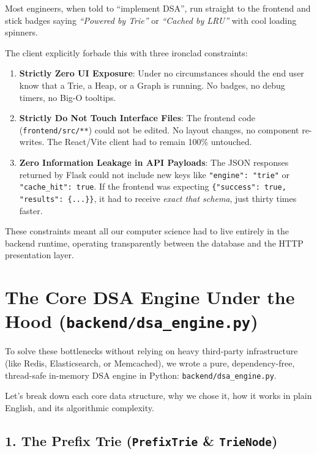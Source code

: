 \documentclass[11pt,a4paper]{article}
\begin{document}
Most engineers, when told to ``implement DSA'', run straight to the frontend and stick badges saying \textit{``Powered by Trie''} or \textit{``Cached by LRU''} with cool loading spinners. 

The client explicitly forbade this with three ironclad constraints:
\begin{enumerate}[leftmargin=1.5cm]
    \item \textbf{Strictly Zero UI Exposure}: Under no circumstances should the end user know that a Trie, a Heap, or a Graph is running. No badges, no debug timers, no Big-O tooltips.
    \item \textbf{Strictly Do Not Touch Interface Files}: The frontend code (\texttt{frontend/src/**}) could not be edited. No layout changes, no component re-writes. The React/Vite client had to remain 100\% untouched.
    \item \textbf{Zero Information Leakage in API Payloads}: The JSON responses returned by Flask could not include new keys like \texttt{"engine": "trie"} or \texttt{"cache\_hit": true}. If the frontend was expecting \texttt{\{"success": true, "results": \{...\}\}}, it had to receive \textit{exact that schema}, just thirty times faster.
\end{enumerate}

These constraints meant all our computer science had to live entirely in the backend runtime, operating transparently between the database and the HTTP presentation layer.

\section{The Core DSA Engine Under the Hood (\texttt{backend/dsa\_engine.py})}

To solve these bottlenecks without relying on heavy third-party infrastructure (like Redis, Elasticsearch, or Memcached), we wrote a pure, dependency-free, thread-safe in-memory DSA engine in Python: \texttt{backend/dsa\_engine.py}.

Let's break down each core data structure, why we chose it, how it works in plain English, and its algorithmic complexity.

\subsection{1. The Prefix Trie (\texttt{PrefixTrie} \& \texttt{TrieNode})}
\end{document}

